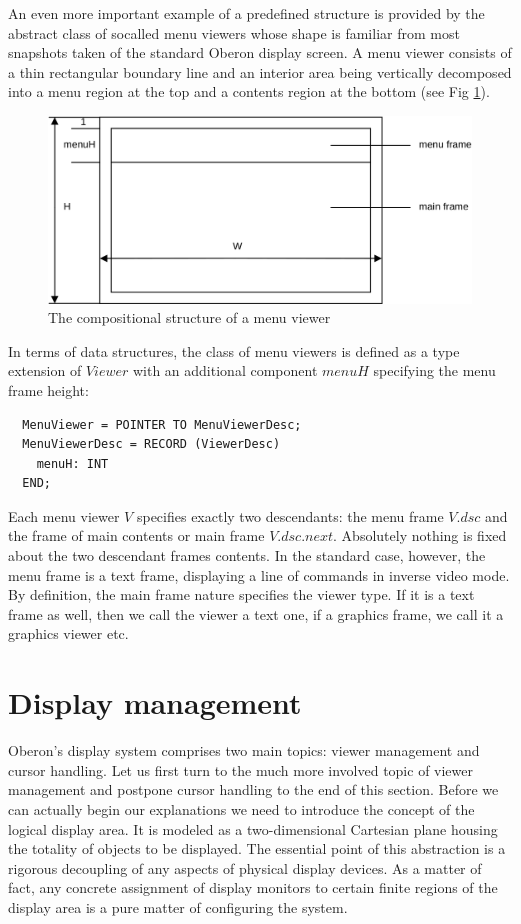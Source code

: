 An even more important example of a predefined structure is provided by the abstract class of socalled menu viewers whose shape is familiar from most snapshots taken of the standard Oberon
display screen. A menu viewer consists of a thin rectangular boundary line and an interior area
being vertically decomposed into a menu region at the top and a contents region at the bottom (see Fig \ref{fig:menu}).
\begin{figure}
	\centering
	\includegraphics[width=\textwidth]{i/7}
	\caption{The compositional structure of a menu viewer}
	\label{fig:menu}
\end{figure}

In terms of data structures, the class of menu viewers is defined as a type extension of $Viewer$ with an additional component $menuH$ specifying the menu frame height:
\begin{verbatim}
  MenuViewer = POINTER TO MenuViewerDesc;
  MenuViewerDesc = RECORD (ViewerDesc)
    menuH: INT
  END;
\end{verbatim}
Each menu viewer $V$ specifies exactly two descendants: the menu frame $V.dsc$ and the frame of main contents or main frame $V.dsc.next$. Absolutely nothing is fixed about the two descendant frames contents. In the standard case, however, the menu frame is a text frame, displaying a line of commands in inverse video mode. By definition, the main frame nature specifies the viewer type. If it is a text frame as well, then we call the viewer a text one, if a graphics frame, we call it a graphics viewer etc.

\section{Display management}
Oberon's display system comprises two main topics: viewer management and cursor handling.
Let us first turn to the much more involved topic of viewer management and postpone cursor
handling to the end of this section. Before we can actually begin our explanations we need to
introduce the concept of the logical display area. It is modeled as a two-dimensional Cartesian
plane housing the totality of objects to be displayed. The essential point of this abstraction is a
rigorous decoupling of any aspects of physical display devices. As a matter of fact, any concrete
assignment of display monitors to certain finite regions of the display area is a pure matter of
configuring the system.

